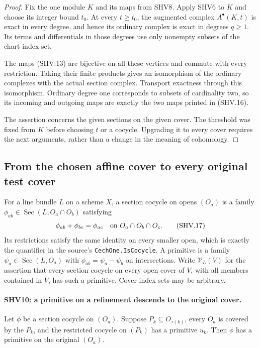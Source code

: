 \documentclass[11pt,a4paper]{article}
\numberwithin{equation}{section}
\theoremstyle{remark}\newtheorem{remark}[theorem]{Remark}
\begin{document}
\begin{proof}
Fix the one module $K$ and its maps from SHV8.  Apply SHV6 to
$K$ and choose its integer bound $t_0$.  At every $t\ge t_0$,
the augmented complex $A^\bullet(K,t)$ is exact in every
degree, and hence its ordinary complex is exact in degrees
$q\ge1$.  Its terms and differentials in those degrees use
only nonempty subsets of the chart index set.

The maps (SHV.13) are bijective on all these vertices and
commute with every restriction.  Taking their finite products
gives an isomorphism of the ordinary complexes with the
actual section complex.  Transport exactness through this
isomorphism.  Ordinary degree one corresponds to subsets of
cardinality two, so its incoming and outgoing maps are exactly
the two maps printed in (SHV.16).

The assertion concerns the given sections on the given cover.
The threshold was fixed from $K$ before choosing $t$ or a
cocycle.  Upgrading it to every cover requires the next
arguments, rather than a change in the meaning of cohomology.
\end{proof}

\subsection{From the chosen affine cover to every original test cover}

For a line bundle $L$ on a scheme $X$, a section cocycle on opens
$(O_a)$ is a family
$\phi_{ab}\in\operatorname{Sec}(L,O_a\cap O_b)$ satisfying
\[
                   \phi_{ab}+\phi_{bc}=\phi_{ac}
                   \quad\hbox{on }O_a\cap O_b\cap O_c.
                                                        \tag{SHV.17}
\]
Its restrictions satisfy the same identity on every smaller open,
which is exactly the quantifier in the source's
\texttt{Cech\allowbreak One.\allowbreak Is\allowbreak Cocycle}.  A primitive is a family
$\psi_a\in\operatorname{Sec}(L,O_a)$ with
$\phi_{ab}=\psi_a-\psi_b$ on intersections.
Write $\mathcal V_L(V)$ for the assertion that every section cocycle
on every open cover of $V$, with all members contained in $V$,
has such a primitive.  Cover index sets may be arbitrary.

\paragraph{SHV10: a primitive on a refinement descends to the original cover.}
\label{claim:SHV10}
Let $\phi$ be a section cocycle on $(O_a)$.  Suppose
$P_k\subseteq O_{\tau(k)}$, every $O_a$ is covered by the
$P_k$, and the restricted cocycle on $(P_k)$ has a primitive
$u_k$.  Then $\phi$ has a primitive on the original $(O_a)$.
\end{document}
